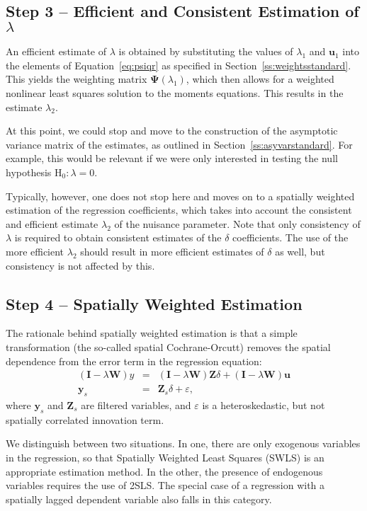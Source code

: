 \documentclass{article}
\begin{document}
\subsection{Step 3 -- Efficient and Consistent Estimation of $\lambda$}
An efficient estimate of $\lambda$ is obtained by substituting the values
of $\lambda_1$ and $\mathbf{u}_1$ into the elements of
Equation~\ref{eq:psiqr} as specified in Section~\ref{ss:weightsstandard}.
This yields the weighting matrix $\mathbf{\Psi}(\lambda_1)$, which then allows for a 
weighted nonlinear least squares solution to the moments equations.
This results in the estimate $\lambda_2$.

At this point, we could stop and move to the construction of the asymptotic
variance matrix of the estimates, as outlined in Section~\ref{ss:asyvarstandard}.
For example, this would be relevant if we were only interested in testing
the null hypothesis $\mbox{H}_0: \lambda = 0$.

Typically, however, one does not stop here and moves on to a spatially weighted
estimation of the regression coefficients, which takes into account the consistent
and efficient estimate $\lambda_2$ of the nuisance parameter. Note that only 
consistency of $\lambda$ is required to obtain consistent estimates of the 
$\delta$ coefficients. The use of the more efficient $\lambda_2$ should result in
more efficient estimates of $\delta$ as well, but consistency is not affected by this.

\subsection{Step 4 -- Spatially Weighted Estimation}\label{ss:spatiallyweighted}
The rationale behind spatially weighted estimation is that a simple transformation
(the so-called spatial Cochrane-Orcutt) removes the spatial dependence from
the error term in the regression equation:
\begin{eqnarray*}
(\mathbf{I} - \lambda \mathbf{W})y &=& (\mathbf{I} - \lambda \mathbf{W}) \mathbf{Z} \delta
+ (\mathbf{I} - \lambda \mathbf{W})\mathbf{u}\\
\mathbf{y}_s &=& \mathbf{Z}_s \delta + \varepsilon,
\end{eqnarray*}
where $\mathbf{y}_s$ and $\mathbf{Z}_s$ are filtered variables,
and $\varepsilon$ is a heteroskedastic, but not spatially correlated innovation term.

We distinguish between two situations. In one, there are only exogenous
variables in the regression, so that Spatially Weighted Least Squares (SWLS) is
an appropriate estimation method. In the other, the presence of endogenous
variables requires the use of 2SLS. The special case of a regression with a
spatially lagged dependent variable also falls in this category.
\end{document}
